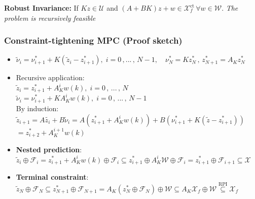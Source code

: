 \textbf{Robust Invariance:} If $Kz \in \mathcal{U}$ and $(A+BK)z + w \in \mathcal{X}_f^{\mathrm{ct}} \, \forall w \in \mathcal{W} $. \textit{The problem is recursively feasible}

\subsubsection{Constraint-tightening MPC (Proof sketch)}
\begin{itemize}[leftmargin=*]
    \item $\tilde{\nu}_i=\nu_{i+1}^*+K(\tilde{z}_i-z_{i+1}^*),\;i=0\,,...\,,\,N-1,\quad \nu_N^*=Kz_N^*\,,\,z_{N+1}^*=A_Kz_N^*$
    \item Recursive application:\\
    $\tilde{z}_i=z_{i+1}^*+A_K^iw(k),\;i=0\,,\,...\,,\,N$\\
    $\tilde{\nu}_i=\nu_{i+1}^*+KA_K^iw(k),\;i=0\,,\,...\,,\,N-1$\\
    By induction: $\tilde{z}_{i+1}=A\tilde{z_i}+B\tilde{\nu}_i=A(z_{i+1}^*+A_K^iw(k))+B(\nu_{i+1}^*+K(\tilde{z}-z_{i+1}^*))$\\
    $=z_{i+2}^*+A_K^{i+1}w(k)$\\
    \item \textbf{Nested prediction}: $\tilde{z}_i\oplus\mathcal{F}_i=z_{i+1}^*+A_K^iw(k)\oplus\mathcal{F}_i\subseteq z_{i+1}^*\oplus A_K^i\mathcal{W}\oplus\mathcal{F}_i=z_{i+1}^*\oplus\mathcal{F}_{i+1}\subseteq \mathcal{X}$\\
    \item \textbf{Terminal constraint}: $\tilde{z}_N\oplus\mathcal{F}_N\subseteq z_{N+1}^*\oplus\mathcal{F}_{N+1}=A_K(z_N^*\oplus\mathcal{F}_N)\oplus\mathcal{W}\subseteq A_K\mathcal{X}_f\oplus\mathcal{W}\overset{\mathrm{RPI}}{\subseteq}\mathcal{X}_f$
\end{itemize}


